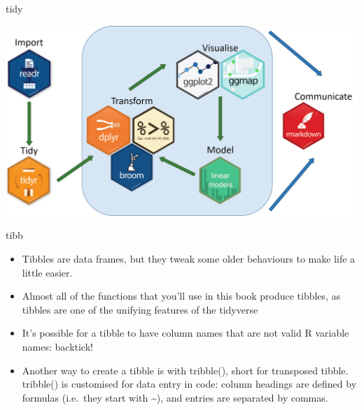 \documentclass[ignorenonframetext,]{beamer}
\providecommand{\tightlist}{%
  \setlength{\itemsep}{0pt}\setlength{\parskip}{0pt}}
\begin{document}
\begin{frame}{tidy}
\protect\hypertarget{tidy}{}


\includegraphics{tidyverse_packages.png}

\end{frame}

\begin{frame}{tibb}
\protect\hypertarget{tibb}{}


\begin{itemize}
\tightlist
\item
  Tibbles are data frames, but they tweak some older behaviours to make
  life a little easier.
\item
  Almost all of the functions that you'll use in this book produce
  tibbles, as tibbles are one of the unifying features of the tidyverse
\item
  It's possible for a tibble to have column names that are not valid R
  variable names: backtick!
\item
  Another way to create a tibble is with tribble(), short for transposed
  tibble. tribble() is customised for data entry in code: column
  headings are defined by formulas (i.e.~they start with
  \textasciitilde{}), and entries are separated by commas.
\end{itemize}

\end{frame}
\end{document}
